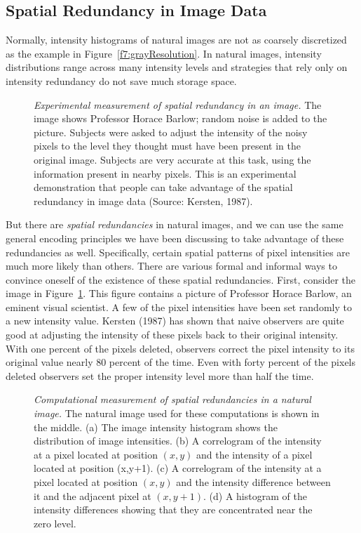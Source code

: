 \subsection*{Spatial Redundancy in Image Data} Normally, intensity
histograms of natural images are not as coarsely discretized
as the example in Figure~\ref{f7:grayResolution}.  In natural images, intensity
distributions range across many intensity levels and
strategies that rely only on intensity redundancy do not save much
storage space.

\begin{figure}
\centerline{  }
\caption[Pixel Redundancy: Barlow]{ {\em Experimental measurement of
spatial redundancy in an image.}  The image shows Professor Horace
Barlow; random noise is added to the picture.  Subjects were asked to
adjust the intensity of the noisy pixels to the level they thought
must have been present in the original image.  Subjects are very
accurate at this task, using the information present in nearby pixels.
This is an experimental demonstration that people can take advantage
of the spatial redundancy in image data (Source: Kersten, 1987).
 }
\label{f7:kersten}
\end{figure} 
But there are {\em spatial redundancies} in natural images, and we can
use the same general encoding principles we have been discussing to
take advantage of these redundancies as well.  Specifically, certain
spatial patterns of pixel intensities are much more likely than
others.  There are various formal and informal ways to convince
oneself of the existence of these spatial redundancies.  First,
consider the image in Figure~\ref{f7:kersten}.  This figure contains a
picture of Professor Horace Barlow, an eminent visual scientist.  A
few of the pixel intensities have been set randomly to a new intensity
value.  Kersten (1987) has shown that naive observers are quite good at
adjusting the intensity of these pixels back to their original
intensity.  With one percent of the pixels deleted, observers correct
the pixel intensity to its original value nearly 80 percent of the
time.  Even with forty percent of the pixels deleted observers set the
proper intensity level more than half the time.

\begin{figure}
\centerline{  }
\caption[Pixel redundancy: Correlograms]{ {\em Computational
measurement of spatial redundancies in a natural image.}  The natural
image used for these computations is shown in the middle.  (a) The
image intensity histogram shows the distribution of image intensities.
(b) A correlogram of the intensity at a pixel located at position
$(x,y)$ and the intensity of a pixel located at position (x,y+1).  (c)
A correlogram of the intensity at a pixel located at position $(x,y)$
and the intensity difference between it and the adjacent pixel at
$(x,y+1)$.  (d) A histogram of the intensity differences showing that
they are concentrated near the zero level.  }
\label{f7:pixel.correlogram}
\end{figure}

